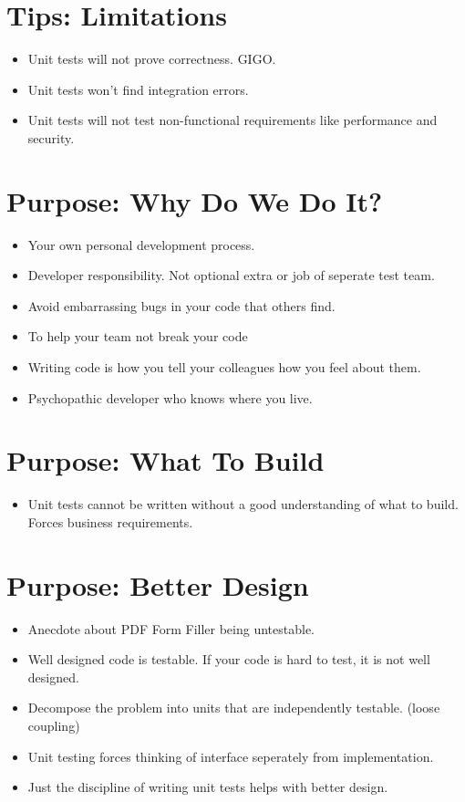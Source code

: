 \documentclass{article}
\begin{document}
\newpage
\section{Tips: Limitations}
\begin{itemize}
    \item Unit tests will not prove correctness. GIGO.
    \item Unit tests won't find integration errors.
    \item Unit tests will not test non-functional requirements like performance
        and security.
\end{itemize}

\newpage
\section{Purpose: Why Do We Do It?}
\begin{itemize}
    \item Your own personal development process.
    \item Developer responsibility. Not optional extra or job of seperate test team.
    \item Avoid embarrassing bugs in your code that others find.
    \item To help your team not break your code
    \item Writing code is how you tell your colleagues how you feel about them.
    \item Psychopathic developer who knows where you live.
\end{itemize}

\newpage
\section{Purpose: What To Build}
\begin{itemize}
    \item Unit tests cannot be written without a good understanding of what to
        build. Forces business requirements.
\end{itemize}

\newpage
\section{Purpose: Better Design}
\begin{itemize}
    \item Anecdote about PDF Form Filler being untestable.
    \item Well designed code is testable. If your code is hard to test, it is
        not well designed.
    \item Decompose the problem into units that are independently testable.
        (loose coupling)
    \item Unit testing forces thinking of interface seperately from implementation.
    \item Just the discipline of writing unit tests helps with better design.
\end{itemize}
\end{document}
